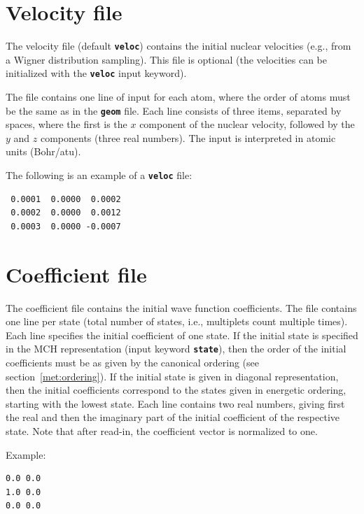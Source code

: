 \documentclass[a4paper,10pt,DIV=15,openany]{scrbook}
\newcommand{\ttt}[1]{\textbf{\texttt{#1}}}
\newenvironment{example}{
  \setlength{\OuterFrameSep}{3pt}
  \vspace{0mm}
  \definecolor{shadecolor}{HTML}{E4F4FF}
  \begin{shaded}
}{
  \end{shaded}
}
\begin{document}
\section{Velocity file}\label{sec:velocfile}

The velocity file (default \ttt{veloc}) contains the initial nuclear velocities (e.g., from a Wigner distribution sampling). This file is optional (the velocities can be initialized with the \ttt{veloc} input keyword). 

The file contains one line of input for each atom, where the order of atoms must be the same as in the \ttt{geom} file. Each line consists of three items, separated by spaces, where the first is the $x$ component of the nuclear velocity, followed by the $y$ and $z$ components (three real numbers). The input is interpreted in atomic units (Bohr/atu).

The following is an example of a \ttt{veloc} file:
\begin{example}
\begin{verbatim}
 0.0001  0.0000  0.0002
 0.0002  0.0000  0.0012
 0.0003  0.0000 -0.0007
\end{verbatim}
\end{example}

\section{Coefficient file}\label{sec:coefffile}

The coefficient file contains the initial wave function coefficients. The file contains one line per state (total number of states, i.e., multiplets count multiple times). Each line specifies the initial coefficient of one state. If the initial state is specified in the MCH representation (input keyword \ttt{state}), then the order of the initial coefficients must be as given by the canonical ordering (see section~\ref{met:ordering}). If the initial state is given in diagonal representation, then the initial coefficients correspond to the states given in energetic ordering, starting with the lowest state.
Each line contains two real numbers, giving first the real and then the imaginary part of the initial coefficient of the respective state.
Note that after read-in, the coefficient vector is normalized to one.

Example:
\begin{example}
  \begin{verbatim}
0.0 0.0
1.0 0.0
0.0 0.0
\end{verbatim}
\end{example}
\end{document}
